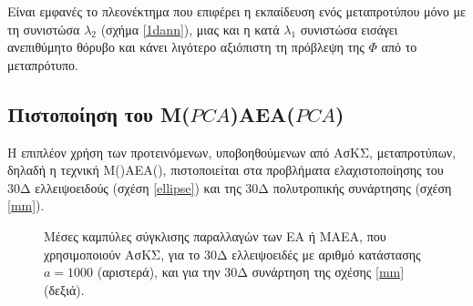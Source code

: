 Είναι εμφανές το πλεονέκτημα που επιφέρει η εκπαίδευση ενός μεταπροτύπου μόνο με τη συνιστώσα $\lambda_2$ (σχήμα \ref{1dann}), μιας και η κατά $\lambda_1$ συνιστώσα εισάγει ανεπιθύμητο θόρυβο και κάνει λιγότερο αξιόπιστη τη πρόβλεψη της $\Phi$ από το μεταπρότυπο.   

\subsection{Πιστοποίηση του Μ($PCA$)ΑΕΑ($PCA$)}

Η επιπλέον χρήση των προτεινόμενων, υποβοηθούμενων από ΑσΚΣ, μεταπροτύπων, δηλαδή η τεχνική Μ()ΑΕΑ(), πιστοποιείται στα προβλήματα ελαχιστοποίησης του 30Δ ελλειψοειδούς (σχέση \ref{ellipse}) και της 30Δ πολυτροπικής συνάρτησης (σχέση \ref{mm}). 


\begin{figure}[h!]
\begin{minipage}[b]{0.5\linewidth}
 \centering
\end{minipage}
\begin{minipage}[b]{0.5\linewidth}
 \centering
\end{minipage}
\caption{Μέσες καμπύλες σύγκλισης παραλλαγών των ΕΑ ή ΜΑΕΑ, που χρησιμοποιούν ΑσΚΣ, για το 30Δ ελλειψοειδές με  αριθμό κατάστασης $a=1000$ (αριστερά), και για την 30Δ συνάρτηση της σχέσης \ref{mm} (δεξιά).} 
\label{ellipse_t2_pca_ipe}
\end{figure} 


